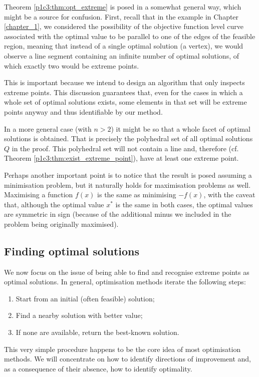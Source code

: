 Theorem \ref{p1c3:thm:opt_extreme} is posed in a somewhat general way, which might be a source for confusion. First, recall that in the example in Chapter \ref{chapter_1}, we considered the possibility of the objective function level curve associated with the optimal value to be parallel to one of the edges of the feasible region, meaning that instead of a single optimal solution (a vertex), we would observe a line segment containing an infinite number of optimal solutions, of which exactly two would be extreme points. 

This is important because we intend to design an algorithm that only inspects extreme points. This discussion guarantees that, even for the cases in which a whole set of optimal solutions exists, some elements in that set will be extreme points anyway and thus identifiable by our method.

In a more general case (with $n > 2$) it might be so that a whole facet of optimal solutions is obtained. That is precisely the polyhedral set of all optimal solutions $Q$ in the proof. This polyhedral set will not contain a line and, therefore (cf. Theorem \ref{p1c3:thm:exist_extreme_point}), have at least one extreme point. 

Perhaps another important point is to notice that the result is posed assuming a minimisation problem, but it naturally holds for maximisation problems as well. Maximising a function $f(x)$ is the same as minimising $-f(x)$, with the caveat that, although the optimal value $x^*$ is the same in both cases, the optimal values are symmetric in sign (because of the additional minus we included in the problem being originally maximised).


\subsection{Finding optimal solutions}

We now focus on the issue of being able to find and recognise extreme points as optimal solutions. In general, optimisation methods iterate the following steps:
%
\begin{enumerate}
	\item Start from an initial (often feasible) solution;
	\item Find a nearby solution with better value;
	\item If none are available, return the best-known solution.	
\end{enumerate}
%
This very simple procedure happens to be the core idea of most optimisation methods. We will concentrate on how to identify directions of improvement and, as a consequence of their absence, how to identify optimality.

